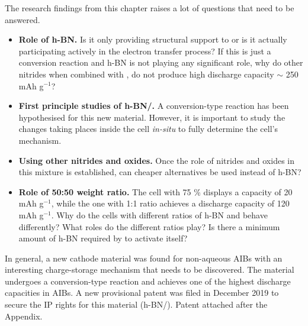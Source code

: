 The research findings from this chapter raises a lot of questions that need to be answered.
\begin{itemize}
    \item \textbf{Role of h-BN.} Is it only providing structural support to  or is it actually participating actively in the electron transfer process? If this is just a conversion reaction and h-BN is not playing any significant role, why do other nitrides when combined with , do not produce high discharge capacity $\sim$ 250 mAh g$^{-1}$?
    \item \textbf{First principle studies of h-BN/.} A conversion-type reaction has been hypothesised for this new material. However, it is important to study the changes taking places inside the cell \textit{in-situ} to fully determine the cell's mechanism. 
    \item \textbf{Using other nitrides and oxides.} Once the role of nitrides and oxides in this mixture is established, can cheaper alternatives be used instead of h-BN? 
    \item \textbf{Role of 50:50 weight ratio.} The cell with 75 \%  displays a capacity of 20 mAh g$^{-1}$, while the one with 1:1 ratio achieves a discharge capacity of 120 mAh g$^{-1}$. Why do the cells with different ratios of h-BN and  behave differently? What roles do the different ratios play? Is there a minimum amount of h-BN required by  to activate itself?  
\end{itemize}

In general, a new cathode material was found for non-aqueous AIBs with an interesting charge-storage mechanism that needs to be discovered. The material undergoes a conversion-type reaction and achieves one of the highest discharge capacities in AIBs. A new provisional patent was filed in December 2019 to secure the IP rights for this material (h-BN/). Patent attached after the Appendix.    